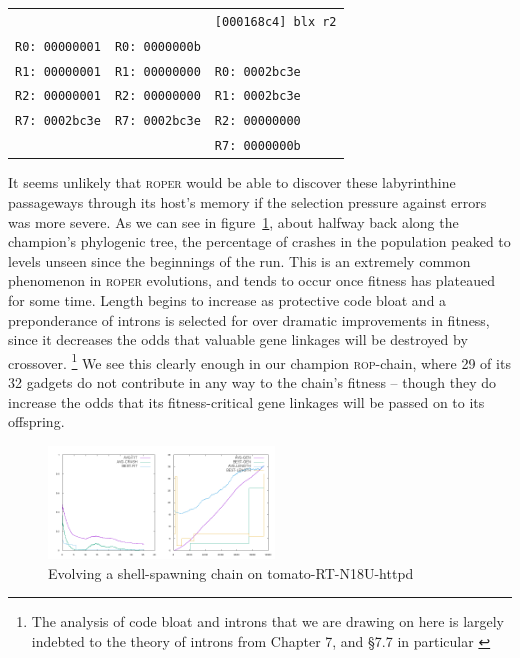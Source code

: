 \begin{table}
\begin{center}
{\begin{tabular}{|l|l|l|}
 					&							& \texttt{[000168c4]  blx r2} \\
\texttt{R0: 00000001}			& \texttt{R0: 0000000b}				& \\
\texttt{R1: 00000001}			& \texttt{R1: 00000000}				& \texttt{R0: 0002bc3e} \\
\texttt{R2: 00000001}			& \texttt{R2: 00000000}				& \texttt{R1: 0002bc3e} \\
\texttt{R7: 0002bc3e}				& \texttt{R7: 0002bc3e}				& \texttt{R2: 00000000} \\
					&							& \texttt{R7: 0000000b} \\ \hline
\end{tabular}
}
\end{center}
\end{table}%



It seems unlikely that \textsc{roper} would be able to discover
these labyrinthine passageways through its host's memory if the
selection pressure against errors was more severe.
As we can see in figure~\ref{shellpattern-graph}, about halfway
back along the champion's phylogenic tree, the percentage of
crashes in the population peaked to levels unseen since the
beginnings of the run. This is an extremely common phenomenon in
\textsc{roper} evolutions, and tends to occur once fitness has
plateaued for some time. Length begins to increase as protective
code bloat and a preponderance of introns is selected for over
dramatic improvements in fitness, since it decreases the odds
that valuable gene linkages will be destroyed by crossover.%
\footnote{The analysis of code bloat and introns that we are
  drawing on here is largely indebted to the theory of introns from Chapter 7, and \S{7.7} in particular \cite{brameier07}}
We see this clearly enough in our champion \textsc{rop}-chain,
where 29 of its 32 gadgets do not contribute in any way to the
chain's fitness -- though they do increase the odds that its
fitness-critical gene linkages will be passed on to its
offspring. 
\begin{figure}
  \includegraphics[width=\columnwidth,height=3cm]{examples/shellpattern/shellpattern.png}
  \caption{Evolving a shell-spawning chain on {tomato-RT-N18U-httpd}}
  \label{shellpattern-graph}
\end{figure}


